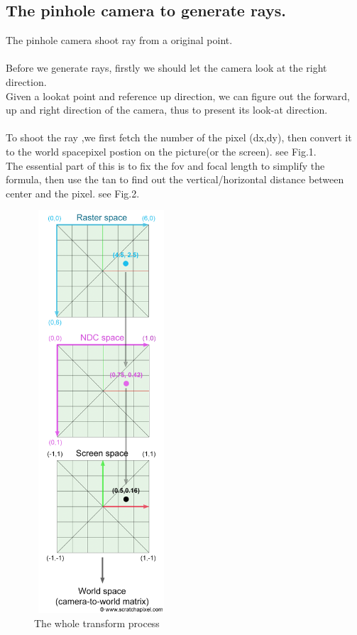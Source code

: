 \documentclass[acmtog]{acmart}
\begin{document}
\subsection{The pinhole camera to generate rays.}
\quad The pinhole camera shoot ray from a original point.\\\\
\quad Before we generate rays, firstly we should let the camera look at the right direction.\\
Given a lookat point and reference up direction, we can figure out the forward, up and right direction of the camera, thus to present its look-at direction.\\\\
\quad To shoot the ray ,we first fetch the number of the pixel (dx,dy), then convert it to the world spacepixel postion on the picture(or the screen). see Fig.1.\\
The essential part of this is to fix the fov and focal length to simplify the formula, then use the tan to find out the vertical/horizontal distance between center and the pixel. see Fig.2.
	\begin{figure}[h]
		\centering
		\includegraphics[width=5cm,height=15cm]{cambasic1A.png}
		\caption{The whole transform process}
	\end{figure}
\end{document}

